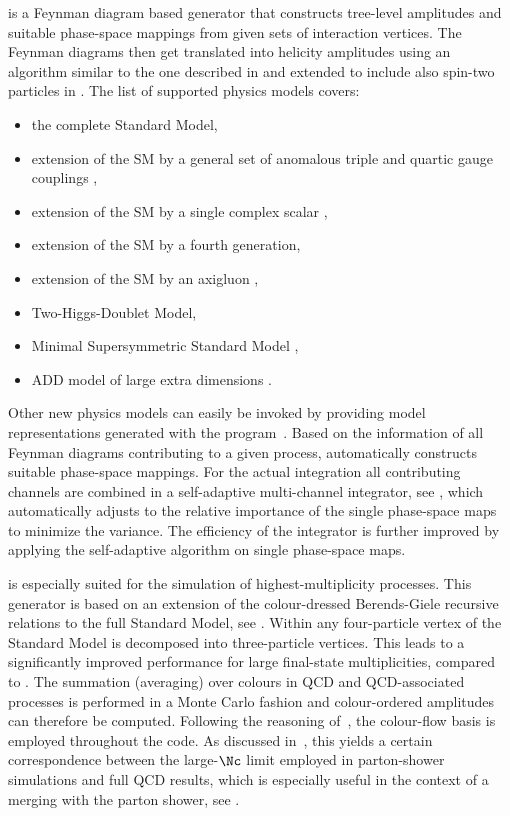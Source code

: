 \Amegic is a Feynman diagram based generator that constructs tree-level 
amplitudes and suitable phase-space mappings from given sets 
of interaction vertices. The Feynman diagrams then get translated into 
helicity amplitudes using an algorithm similar to the one described in 
\cite{Kleiss:1985yh,Ballestrero:1992dv} and extended to include also 
spin-two particles in \cite{Gleisberg:2003ue}. The list of supported 
physics models covers:
\begin{itemize}
  \item the complete Standard Model,
  \item extension of the SM by a general set of anomalous triple and
    quartic gauge couplings \cite{Appelquist:1980vg,Appelquist:1993ka},
  \item extension of the SM by a single complex scalar
	\cite{Dedes:2008bf},
  \item extension of the SM by a fourth generation,
  \item extension of the SM by an axigluon
	\cite{Pati:1975ze,Hall:1985wz,Frampton:1987dn,Frampton:1987ut,Bagger:1987fz},
  \item Two-Higgs-Doublet Model,
  \item Minimal Supersymmetric Standard Model \cite{Hagiwara:2005wg}, 
  \item ADD model of large extra dimensions
    \cite{ArkaniHamed:1998rs,Antoniadis:1998ig}.
\end{itemize}
Other new physics models can easily be invoked by providing model 
representations generated with the \FeynRules 
program~\cite{Christensen:2008py,Christensen:2009jx}. Based on the 
information of all Feynman diagrams contributing to a given process,
\Amegic automatically constructs suitable phase-space mappings. For the
actual integration all contributing channels are combined in a self-adaptive 
multi-channel integrator, see , which automatically
adjusts to the relative  importance of the single phase-space maps to
minimize the variance. The efficiency of the integrator is further 
improved by applying the self-adaptive \Vegas \cite{Lepage:1980dq} 
algorithm on single phase-space maps.

\Comix is especially suited for the simulation of highest-multiplicity 
processes. This generator is based on an extension of the colour-dressed 
Berends-Giele recursive relations 
to the full Standard Model, see . Within \Comix any 
four-particle vertex of the Standard Model is decomposed into 
three-particle vertices. This leads to a significantly improved 
performance for large final-state multiplicities, compared to \Amegic. 
The summation (averaging) over colours in QCD and QCD-associated processes 
is performed in a Monte Carlo fashion and colour-ordered amplitudes can 
therefore be computed. Following the reasoning of~\cite{Duhr:2006iq}, 
the colour-flow basis is employed throughout the code. As discussed 
in~\cite{Maltoni:2002mq}, this yields a certain correspondence between 
the large-$\Nc$ limit employed in parton-shower simulations and full QCD 
results, which is especially useful in the context of a merging with the 
parton shower, see . 


